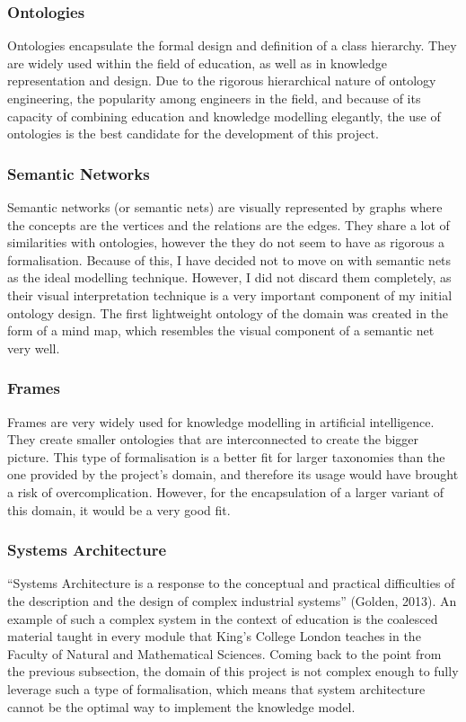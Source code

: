 \documentclass[titlepage]{article}
\begin{document}
\subsubsection{Ontologies}
Ontologies encapsulate the formal design and definition of a class hierarchy. They are widely used within the field of education\cite{wikiontology}, as well as in knowledge representation and design.
\newline
Due to the rigorous hierarchical nature of ontology engineering, the popularity among engineers in the field, and because of its capacity of combining education and knowledge modelling elegantly, the use of ontologies is the best candidate for the development of this project.

\subsubsection{Semantic Networks}
Semantic networks (or semantic nets) are visually represented by graphs where the concepts are the vertices and the relations are the edges\cite{semnet}. They share a lot of similarities with ontologies, however the they do not seem to have as rigorous a formalisation.
\newline
Because of this, I have decided not to move on with semantic nets as the ideal modelling technique. However, I did not discard them completely, as their visual interpretation technique is a very important component of my initial ontology design. The first lightweight ontology of the domain was created in the form of a mind map, which resembles the visual component of a semantic net very well.

\subsubsection{Frames}
Frames are very widely used for knowledge modelling in artificial intelligence. They create smaller ontologies that are interconnected to create the bigger picture.
\newline
This type of formalisation is a better fit for larger taxonomies than the one provided by the project's domain, and therefore its usage would have brought a risk of overcomplication. However, for the encapsulation of a larger variant of this domain, it would be a very good fit.

\subsubsection{Systems Architecture}
``Systems Architecture is a response to the conceptual and practical difficulties of the description and the design of complex industrial systems'' (Golden, 2013)\cite{golden}. An example of such a complex system in the context of education is the coalesced material taught in every module that King's College London teaches in the Faculty of Natural and Mathematical Sciences.
\newline
Coming back to the point from the previous subsection, the domain of this project is not complex enough to fully leverage such a type of formalisation, which means that system architecture cannot be the optimal way to implement the knowledge model.
\end{document}
